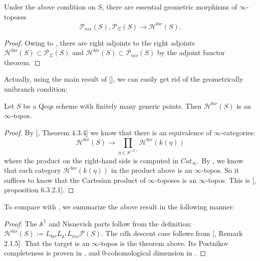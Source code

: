 \begin{cor}
    Under the above condition on $S$, there are essential geometric morphisms of $\infty$-toposes $$ \mathcal{P}_{nis}(S), \mathcal{P}_{\Sigma}(S)\to \mathcal{H}^{bir}(S).$$
\end{cor}
\begin{proof}
Owing to , there are right adjoints to the right adjoints $\mathcal{H}^{bir}(S)\subset \mathcal{P}_\Sigma(S)$ and $\mathcal{H}^{bir}(S)\subset \mathcal{P}_{nis}(S)$ by the adjoint functor theorem.
\end{proof}
Actually, using the main result of [\cite{sfbat}], we can easily get rid of the geometrically unibranch condition:

\begin{thm}\label{bir topos on fin gen pt}
    Let $S$ be a Qcqs scheme with finitely many generic points. Then $\mathcal{H}^{bir}(S)$ is an $\infty$-topos.
\end{thm}
\begin{proof}
    By [\cite{sfbat}, Theorem 4.3.4] we know that there is an equivalence of $\infty$-categories:
    $$\mathcal{H}^{bir}(S)\to\underset{\eta\in S^{(0)}}{\prod}\mathcal{H}^{bir}(k(\eta))$$
    where the product on the right-hand side is computed in $Cat_\infty$. By , we know that each category $\mathcal{H}^{bir}(k(\eta))$ in the product above is an $\infty$-topos. So it suffices to know that the Cartesian product of $\infty$-toposes is an $\infty$-topos. This is [\cite{lurie2009higher}, proposition 6.3.2.1].
\end{proof}
To compare with , we summarize the above result in the following manner:
\begin{proof}
    The $\mathbb{A}^1$ and Nisnevich parts follow from the definition: $\mathcal{H}^{bir}(S):=L_{bir}L_{\mathbb{A}^1}L_{nis}\mathcal{P}(S)$. The cdh descent case follows from [\cite{0bat}, Remark 2.1.5]. That the target is an $\infty$-topos is the theorem above. Its Postnikov completeness is proven in , and $0$-cohomological dimension in .
\end{proof}

